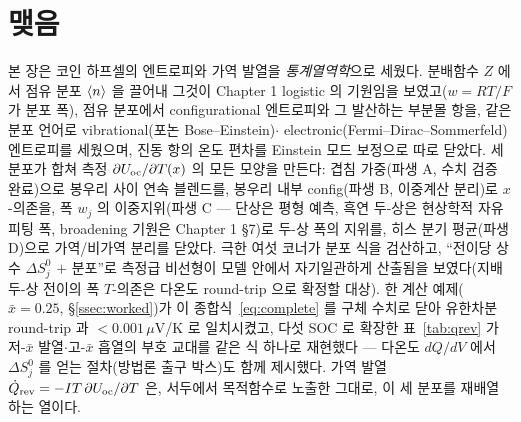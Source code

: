 \section*{맺음}

본 장은 코인 하프셀의 엔트로피와 가역 발열을 \emph{통계열역학}으로 세웠다. 분배함수 $Z$ 에서 점유 분포
$\langle n\rangle$ 을 끌어내 그것이 Chapter 1 logistic 의 기원임을 보였고($w=RT/F$ 가 분포 폭), 점유 분포에서
configurational 엔트로피와 그 발산하는 부분몰 항을, 같은 분포 언어로 vibrational(포논 Bose--Einstein)$\cdot$
electronic(Fermi--Dirac--Sommerfeld) 엔트로피를 세웠으며, 진동 항의 온도 편차를 Einstein 모드 보정으로 따로
닫았다. 세 분포가 합쳐 측정 $\partial U_{\mathrm{oc}}/\partial T(x)$ 의 모든 모양을 만든다: 겹침 가중(파생 A, 수치 검증
완료)으로 봉우리 사이 연속 블렌드를, 봉우리 내부 config(파생 B, 이중계산 분리)로 $x$-의존을, 폭 $w_j$ 의
이중지위(파생 C --- 단상은 평형 예측, 흑연 두-상은 현상학적 자유 피팅 폭, broadening 기원은 Chapter 1 §7)로
두-상 폭의 지위를, 히스 분기 평균(파생 D)으로 가역/비가역 분리를 닫았다. 극한 여섯 코너가 분포 식을 검산하고,
``전이당 상수 $\Delta S^0_j$ $+$ 분포''로 측정급 비선형이 모델 안에서 자기일관하게 산출됨을 보였다(지배 두-상
전이의 폭 $T$-의존은 다온도 round-trip 으로 확정할 대상). 한 계산 예제($\bar x{=}0.25$, \S\ref{ssec:worked})가
이 종합식~\eqref{eq:complete} 를 구체 수치로 닫아 유한차분 round-trip 과 $<0.001\,\mu$V/K 로 일치시켰고, 다섯
SOC 로 확장한 표~\ref{tab:qrev} 가 저-$\bar x$ 발열$\cdot$고-$\bar x$ 흡열의 부호 교대를 같은 식 하나로
재현했다 --- 다온도 $dQ/dV$ 에서 $\Delta S^0_j$ 를 얻는 절차(방법론 출구 박스)도 함께 제시했다. 가역 발열
$\dot Q_{\mathrm{rev}}=-IT\,\partial U_{\mathrm{oc}}/\partial T$ 은, 서두에서 목적함수로 노출한 그대로, 이 세 분포를 재배열하는
열이다.

